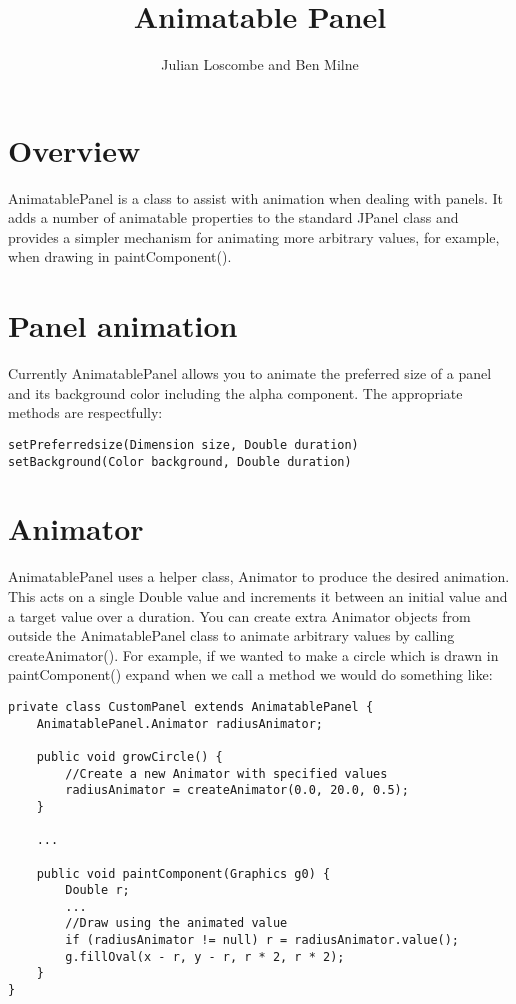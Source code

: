 \documentclass[a4paper, 12pt]{article}
\title{Animatable Panel}
\author{Julian Loscombe and Ben Milne}
\begin{document}
\maketitle 
\section{Overview}
AnimatablePanel is a class to assist with animation when dealing with panels. It adds a number of animatable properties to the standard JPanel class and provides a simpler mechanism for animating more arbitrary values, for example, when drawing in paintComponent().
\section{Panel animation}
Currently AnimatablePanel allows you to animate the preferred size of a panel and its background color including the alpha component. The appropriate methods are respectfully:\\
\begin{lstlisting}
setPreferredsize(Dimension size, Double duration)
setBackground(Color background, Double duration)
\end{lstlisting}
\section{Animator}
AnimatablePanel uses a helper class, Animator to produce the desired animation. This acts on a single Double value and increments it between an initial value and a target value over a duration. You can create extra Animator objects from outside the AnimatablePanel class to animate arbitrary values by calling createAnimator(). For example, if we wanted to make a circle which is drawn in paintComponent() expand when we call a method we would do something like:\\
\begin{lstlisting}
private class CustomPanel extends AnimatablePanel {
	AnimatablePanel.Animator radiusAnimator;
	
	public void growCircle() {
		//Create a new Animator with specified values
		radiusAnimator = createAnimator(0.0, 20.0, 0.5);
	}
	
	...
	
	public void paintComponent(Graphics g0) {
		Double r;
		...
		//Draw using the animated value
		if (radiusAnimator != null) r = radiusAnimator.value();
		g.fillOval(x - r, y - r, r * 2, r * 2);
	}
}
\end{lstlisting}
\pagebreak
\end{document}

